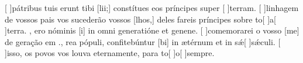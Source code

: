 {  {[ ]{pá}tribus tuis erunt tibi [lii;] constítues eos príncipes super [ ]{ter}ram.}%
    {[ ]{li}nhagem de vossos pais vos sucederão vossos [\-lhos,] deles fareis príncipes sobre to[ ]{a}[ ]{ter}ra. },
  { ero nóminis [i] in omni generatióne et genene.}%
    {[ ]{co}memorarei o vosso [me] de geração em .},
  {rea pópuli, confitebúntur [bi] in ætérnum et in sǽ[ ]{sǽ}culi.}%
    {[ ]{is}so, os povos vos louva eternamente, para to[ ]{o}[ ]{sem}pre.}
}